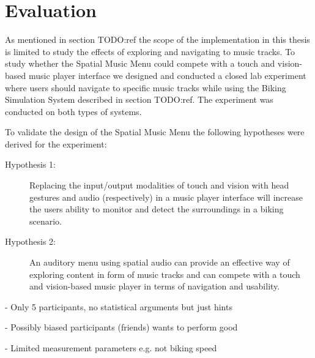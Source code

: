 \chapter{Evaluation}
As mentioned in section TODO:ref the scope of the implementation in this thesis is limited to study the effects of exploring and navigating to music tracks. To study whether the Spatial Music Menu could compete with a touch and vision-based music player interface we designed and conducted a closed lab experiment where users should navigate to specific music tracks while using the Biking Simulation System described in section TODO:ref. The experiment was conducted on both types of systems.


To validate the design of the Spatial Music Menu the following hypotheses were derived for the experiment:

\begin{description}
\item[Hypothesis 1:] Replacing the input/output modalities of touch and vision with head gestures and audio (respectively) in a music player interface will increase the users ability to monitor and detect the surroundings in a biking scenario.
\end{description}

\begin{description}
\item[Hypothesis 2:] An auditory menu using spatial audio can provide an effective way of exploring content in form of music tracks and can compete with a touch and vision-based music player in terms of navigation and usability.
\end{description}



- Only 5 participants, no statistical arguments but just hints

- Possibly biased participants (friends) wants to perform good

- Limited measurement parameters e.g. not biking speed


